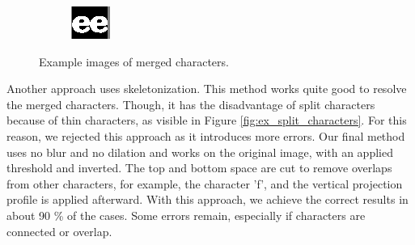 \documentclass[english, paper=a4]{scrartcl}
\begin{document}
\begin{figure}
	\begin{subfigure}{0.25\textwidth}
		\includegraphics[width=\textwidth]{mergedChars3.PNG}
		\label{fig:ex2b}
	\end{subfigure}
	\caption{Example images of merged characters.}
	\label{fig:ex_merged_characters}
\end{figure}

Another approach uses skeletonization.
This method works quite good to resolve the merged characters. Though, it has the disadvantage of split characters because of thin characters, as visible in Figure \ref{fig:ex_split_characters}.
For this reason, we rejected this approach as it introduces more errors. 
Our final method uses no blur and no dilation and works on the original image, with an applied threshold and inverted.
The top and bottom space are cut to remove overlaps from other characters, for example, the character 'f', and the 
vertical projection profile is applied afterward. With this approach, we achieve the correct results in about 90 \% of the cases.
Some errors remain, especially if characters are connected or overlap.
\end{document}
